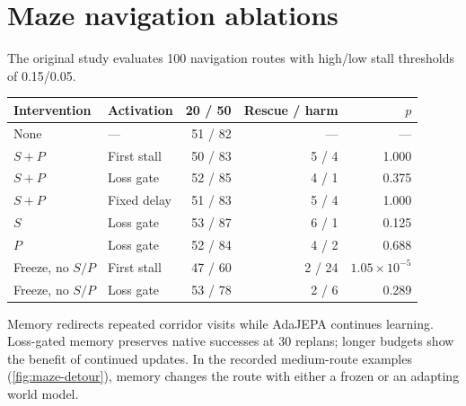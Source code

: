 \begin{table}[!t]
\begin{minipage}[t]{\columnwidth}
\section{Maze navigation ablations}
\label{sec:maze-details}
The original study evaluates 100 navigation routes with high/low stall thresholds of 0.15/0.05.\par\smallskip
{\centering\par}\par

\end{minipage}\hfill
\begin{minipage}[t]{\columnwidth}
\vspace{0pt}
\par\smallskip
{\centering
{}
\label{tab:maze-full}
\small
\setlength{\tabcolsep}{2.1pt}
\begin{tabular}{@{}llrrr@{}}
\toprule
Intervention & Activation & 20 / 50 & Rescue / harm & $p$\\
\midrule
None & --- &51 / 82&---&---\\
$S{+}P$ & First stall &50 / 83&5 / 4&1.000\\
$S{+}P$ & Loss gate &52 / 85&4 / 1&0.375\\
$S{+}P$ & Fixed delay &51 / 83&5 / 4&1.000\\
$S$ & Loss gate &53 / 87&6 / 1&0.125\\
$P$ & Loss gate &52 / 84&4 / 2&0.688\\
Freeze, no $S/P$ & First stall &47 / 60&2 / 24&$1.05\!\times\!10^{-5}$\\
Freeze, no $S/P$ & Loss gate &53 / 78&2 / 6&0.289\\
\bottomrule
\end{tabular}
\par}
\par\smallskip
Memory redirects repeated corridor visits while AdaJEPA continues learning. Loss-gated memory preserves native successes at 30 replans; longer budgets show the benefit of continued updates. In the recorded medium-route examples (\cref{fig:maze-detour}), memory changes the route with either a frozen or an adapting world model.\par

\end{minipage}\par

\end{table}
